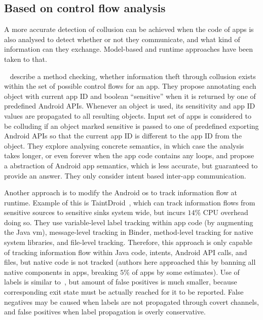 \documentclass[article, oneside]{aaltoseries}
\begin{document}
\subsection{Based on control flow analysis}
\label{sec:flow}

A more accurate detection of collusion can be achieved when the code of apps is also analysed to detect whether or not they communicate, and what kind of information can they exchange. Model-based and runtime approaches have been taken to that.

\citeauthor{Asavoae2018}~\cite{Asavoae2018} describe a method checking, whether information theft through collusion exists within the set of possible control flows for an app. They propose annotating each object with current app ID and boolean ``sensitive'' when it is returned by one of predefined Android APIs. Whenever an object is used, its sensitivity and app ID values are propagated to all resulting objects. Input set of apps is considered to be colluding if an object marked sensitive is passed to one of predefined exporting Android APIs so that the current app ID is different to the app ID from the object. They explore analysing concrete semantics, in which case the analysis takes longer, or even forever when the app code contains any loops, and propose a abstraction of Android app semantics, which is less accurate, but guaranteed to provide an answer. They only consider intent based inter-app communication.

Another approach is to modify the Android \gls{os} to track information flow at runtime. Example of this is TaintDroid~\cite{Enck2014}, which can track information flows from sensitive sources to sensitive sinks system wide, but incurs $14\%$ CPU overhead doing so. They use variable-level label tracking within app code (by augmenting the Java \gls{vm}), message-level tracking in Binder, method-level tracking for native system libraries, and file-level tracking. Therefore, this approach is only capable of tracking information flow within Java code, intents, Android API calls, and files, but native code is not tracked (authors here approached this by banning all native components in apps, breaking $5\%$ of apps by some estimates). Use of labels is similar to~\cite{Asavoae2018}, but amount of false positives is much smaller, because corresponding exit state must be actually reached for it to be reported. False negatives may be caused when labels are not propagated through covert channels, and false positives when label propagation is overly conservative.
\end{document}
